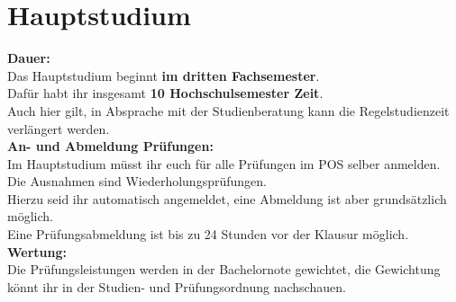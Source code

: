 \section{Hauptstudium}
\textbf{Dauer:}\\
Das Hauptstudium beginnt \textbf{im dritten Fachsemester}.\\
Dafür habt ihr insgesamt \textbf{10 Hochschulsemester Zeit}.\\
Auch hier gilt, in Absprache mit der Studienberatung kann die Regelstudienzeit verlängert werden.\\

\textbf{An- und Abmeldung Prüfungen:}\\
Im Hauptstudium müsst ihr euch für alle Prüfungen im POS selber anmelden.\\
Die Ausnahmen sind Wiederholungsprüfungen.\\
Hierzu seid ihr automatisch angemeldet, eine Abmeldung ist aber grundsätzlich möglich.\\ %
Eine Prüfungsabmeldung ist bis zu 24 Stunden vor der Klausur möglich.\\

\textbf{Wertung:}\\
Die Prüfungsleistungen werden in der Bachelornote gewichtet, die Gewichtung könnt ihr in der \glqq Studien- und Prüfungsordnung \grqq nachschauen.\\

